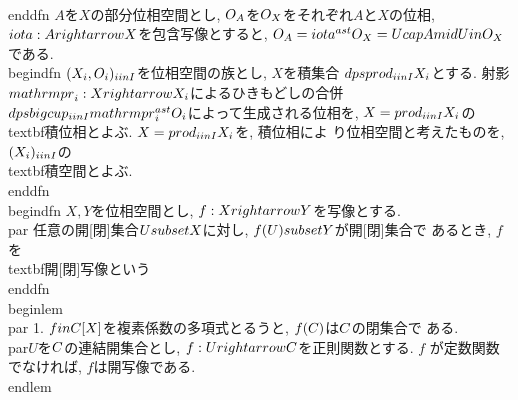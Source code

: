 \\end{dfn}
$A$を$X$の部分位相空間とし, $\\O_{A}$を$\\O_{X}$をそれぞれ$A$と$X$の位相,
$\\iota:A\\rightarrow X$を包含写像とすると,
$\\O_{A}=\\iota^{\\ast}\\O_{X}=\\{U\\cap A\\mid U\\in \\O_{X}\\}$である.
\\begin{dfn}
$(X_{i}, \\O_{i})_{i\\in I}$を位相空間の族とし, $X$を積集合
 $\\dps\\prod_{i\\in I}X_{i}$とする. 射影$\\mathrm{pr}_{i}:X\\rightarrow
 X_{i}$によるひきもどしの合併$\\dps\\bigcup_{i\\in
 I}\\mathrm{pr}_{i}^{\\ast}\\O_{i}$によって生成される位相を, $X=\\prod_{i\\in
 I}X_{i}$の\\textbf{積位相}とよぶ. $X=\\prod_{i\\in I}X_{i}$を, 積位相によ
 り位相空間と考えたものを, $(X_{i})_{i\\in I}$の\\textbf{積空間}とよぶ.
\\end{dfn}
 \\begin{dfn}
  $X, Y$を位相空間とし, $f:X\\rightarrow Y$を写像とする.
  \\par 任意の開[閉]集合$U\\subset X$に対し, $f(U)\\subset Y$が開[閉]集合で
  あるとき, $f$を\\textbf{開[閉]写像}という
 \\end{dfn}
 \\begin{lem}
  \\par 1. $f\\in \\C[X]$を複素係数の多項式とるうと, $f(\\C)$は$\\C$の閉集合で
  ある.
  \\par$U$を$\\C$の連結開集合とし, $f:U\\rightarrow \\C$を正則関数とする. $f$
  が定数関数でなければ, $f$は開写像である.
 \\end{lem}

